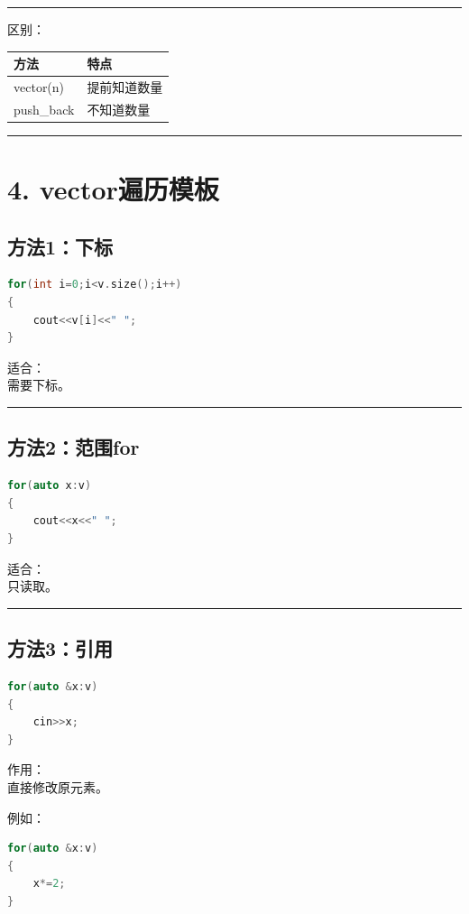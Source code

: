 \documentclass[9pt,twocolumn]{extarticle}
\begin{document}
\noindent\rule{\linewidth}{0.4pt}

区别：
\begin{table}[h]
\centering
\begin{tabular}{|l|l|}
\hline
方法 & 特点 \\ \hline
vector(n) & 提前知道数量 \\ \hline
push\_back & 不知道数量 \\ \hline
\end{tabular}
\end{table}

\noindent\rule{\linewidth}{0.4pt}

\section{4. vector遍历模板}

\subsection{方法1：下标}
\begin{lstlisting}[language=C++]
for(int i=0;i<v.size();i++)
{
    cout<<v[i]<<" ";
}
\end{lstlisting}
适合：\\
需要下标。

\noindent\rule{\linewidth}{0.4pt}

\subsection{方法2：范围for}
\begin{lstlisting}[language=C++]
for(auto x:v)
{
    cout<<x<<" ";
}
\end{lstlisting}
适合：\\
只读取。

\noindent\rule{\linewidth}{0.4pt}

\subsection{方法3：引用}
\begin{lstlisting}[language=C++]
for(auto &x:v)
{
    cin>>x;
}
\end{lstlisting}
作用：\\
直接修改原元素。

例如：
\begin{lstlisting}[language=C++]
for(auto &x:v)
{
    x*=2;
}
\end{lstlisting}
\end{document}
